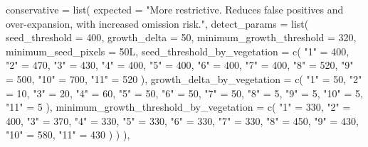 \documentclass[
  british,
  a4paper,
]{scrbook}
\newenvironment{Shaded}{\begin{snugshade}}{\end{snugshade}}
\newcommand{\AttributeTok}[1]{\textcolor[rgb]{0.40,0.45,0.13}{#1}}
\newcommand{\DecValTok}[1]{\textcolor[rgb]{0.68,0.00,0.00}{#1}}
\newcommand{\FunctionTok}[1]{\textcolor[rgb]{0.28,0.35,0.67}{#1}}
\newcommand{\NormalTok}[1]{\textcolor[rgb]{0.00,0.23,0.31}{#1}}
\newcommand{\OtherTok}[1]{\textcolor[rgb]{0.00,0.23,0.31}{#1}}
\newcommand{\StringTok}[1]{\textcolor[rgb]{0.13,0.47,0.30}{#1}}
\begin{document}
\begin{Shaded}
\begin{Highlighting}[]
  \AttributeTok{conservative =} \FunctionTok{list}\NormalTok{(}
    \AttributeTok{expected =} \StringTok{"More restrictive. Reduces false positives and over{-}expansion, with increased omission risk."}\NormalTok{,}
    \AttributeTok{detect\_params =} \FunctionTok{list}\NormalTok{(}
      \AttributeTok{seed\_threshold =} \DecValTok{400}\NormalTok{,}
      \AttributeTok{growth\_delta =} \DecValTok{50}\NormalTok{,}
      \AttributeTok{minimum\_growth\_threshold =} \DecValTok{320}\NormalTok{,}
      \AttributeTok{minimum\_seed\_pixels =} \DecValTok{50}\NormalTok{L,}
      \AttributeTok{seed\_threshold\_by\_vegetation =} \FunctionTok{c}\NormalTok{(}
        \StringTok{"1"} \OtherTok{=} \DecValTok{400}\NormalTok{, }\StringTok{"2"} \OtherTok{=} \DecValTok{470}\NormalTok{, }\StringTok{"3"} \OtherTok{=} \DecValTok{430}\NormalTok{, }\StringTok{"4"} \OtherTok{=} \DecValTok{400}\NormalTok{, }\StringTok{"5"} \OtherTok{=} \DecValTok{400}\NormalTok{,}
        \StringTok{"6"} \OtherTok{=} \DecValTok{400}\NormalTok{, }\StringTok{"7"} \OtherTok{=} \DecValTok{400}\NormalTok{, }\StringTok{"8"} \OtherTok{=} \DecValTok{520}\NormalTok{, }\StringTok{"9"} \OtherTok{=} \DecValTok{500}\NormalTok{, }\StringTok{"10"} \OtherTok{=} \DecValTok{700}\NormalTok{, }\StringTok{"11"} \OtherTok{=} \DecValTok{520}
\NormalTok{      ),}
      \AttributeTok{growth\_delta\_by\_vegetation =} \FunctionTok{c}\NormalTok{(}
        \StringTok{"1"} \OtherTok{=} \DecValTok{50}\NormalTok{, }\StringTok{"2"} \OtherTok{=} \DecValTok{10}\NormalTok{, }\StringTok{"3"} \OtherTok{=} \DecValTok{20}\NormalTok{, }\StringTok{"4"} \OtherTok{=} \DecValTok{60}\NormalTok{, }\StringTok{"5"} \OtherTok{=} \DecValTok{50}\NormalTok{,}
        \StringTok{"6"} \OtherTok{=} \DecValTok{50}\NormalTok{, }\StringTok{"7"} \OtherTok{=} \DecValTok{50}\NormalTok{, }\StringTok{"8"} \OtherTok{=} \DecValTok{5}\NormalTok{, }\StringTok{"9"} \OtherTok{=} \DecValTok{5}\NormalTok{, }\StringTok{"10"} \OtherTok{=} \DecValTok{5}\NormalTok{, }\StringTok{"11"} \OtherTok{=} \DecValTok{5}
\NormalTok{      ),}
      \AttributeTok{minimum\_growth\_threshold\_by\_vegetation =} \FunctionTok{c}\NormalTok{(}
        \StringTok{"1"} \OtherTok{=} \DecValTok{330}\NormalTok{, }\StringTok{"2"} \OtherTok{=} \DecValTok{400}\NormalTok{, }\StringTok{"3"} \OtherTok{=} \DecValTok{370}\NormalTok{, }\StringTok{"4"} \OtherTok{=} \DecValTok{330}\NormalTok{, }\StringTok{"5"} \OtherTok{=} \DecValTok{330}\NormalTok{,}
        \StringTok{"6"} \OtherTok{=} \DecValTok{330}\NormalTok{, }\StringTok{"7"} \OtherTok{=} \DecValTok{330}\NormalTok{, }\StringTok{"8"} \OtherTok{=} \DecValTok{450}\NormalTok{, }\StringTok{"9"} \OtherTok{=} \DecValTok{430}\NormalTok{, }\StringTok{"10"} \OtherTok{=} \DecValTok{580}\NormalTok{, }\StringTok{"11"} \OtherTok{=} \DecValTok{430}
\NormalTok{      )}
\NormalTok{    )}
\NormalTok{  ),}


\end{Highlighting}
\end{Shaded}
\end{document}
